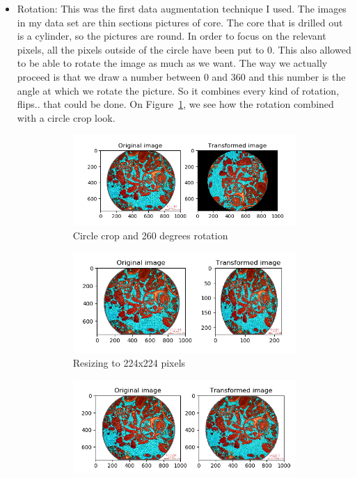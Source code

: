 \begin{itemize}
    \item Rotation: This was the first data augmentation technique I used. The images in my data set are thin sections pictures of core. The core that is drilled out is a cylinder, so the pictures are round. In order to focus on the relevant pixels, all the pixels outside of the circle have been put to 0. This also allowed to be able to rotate the image as much as we want. The way we actually proceed is that we draw a number between 0 and 360 and this number is the angle at which we rotate the picture. So it combines every kind of rotation, flips.. that could be done. On Figure~\ref{fig:rotate}, we see how the rotation combined with a circle crop look.
\begin{figure}
\begin{subfigure}{.5\textwidth}
  \centering
  \includegraphics[width=.8\linewidth]{./figures/03-rotation_260}
  \caption{Circle crop and 260 degrees rotation}
  \label{fig:rotate}
\end{subfigure}%
\begin{subfigure}{.5\textwidth}
  \centering
  \includegraphics[width=.8\linewidth]{figures/03-resize.PNG}
  \caption{Resizing to 224x224 pixels}
  \label{fig:resize}
\end{subfigure}
\begin{subfigure}{.5\textwidth}
  \centering
  \includegraphics[width=.8\linewidth]{figures/03-elastic_trans_08_03.PNG}

\end{subfigure}
\end{figure}
\end{itemize}
